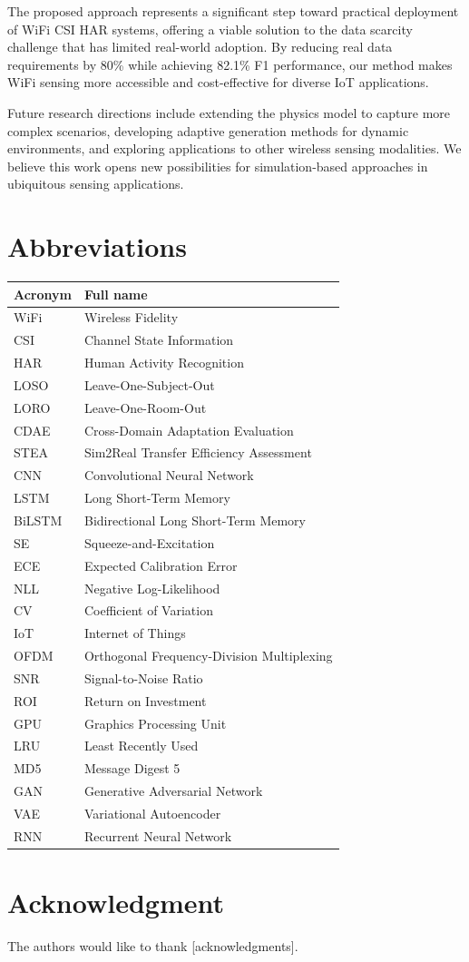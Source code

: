 \documentclass[journal]{IEEEtran}
\begin{document}
The proposed approach represents a significant step toward practical deployment of WiFi CSI HAR systems, offering a viable solution to the data scarcity challenge that has limited real-world adoption. By reducing real data requirements by 80\% while achieving 82.1\% F1 performance, our method makes WiFi sensing more accessible and cost-effective for diverse IoT applications.

Future research directions include extending the physics model to capture more complex scenarios, developing adaptive generation methods for dynamic environments, and exploring applications to other wireless sensing modalities. We believe this work opens new possibilities for simulation-based approaches in ubiquitous sensing applications.

\section*{Abbreviations}
\begin{table}[h]
\centering
\begin{tabular}{@{}ll@{}}
\toprule
\textbf{Acronym} & \textbf{Full name} \\
\midrule
WiFi & Wireless Fidelity \\
CSI & Channel State Information \\
HAR & Human Activity Recognition \\
LOSO & Leave-One-Subject-Out \\
LORO & Leave-One-Room-Out \\
CDAE & Cross-Domain Adaptation Evaluation \\
STEA & Sim2Real Transfer Efficiency Assessment \\
CNN & Convolutional Neural Network \\
LSTM & Long Short-Term Memory \\
BiLSTM & Bidirectional Long Short-Term Memory \\
SE & Squeeze-and-Excitation \\
ECE & Expected Calibration Error \\
NLL & Negative Log-Likelihood \\
CV & Coefficient of Variation \\
IoT & Internet of Things \\
OFDM & Orthogonal Frequency-Division Multiplexing \\
SNR & Signal-to-Noise Ratio \\
ROI & Return on Investment \\
GPU & Graphics Processing Unit \\
LRU & Least Recently Used \\
MD5 & Message Digest 5 \\
GAN & Generative Adversarial Network \\
VAE & Variational Autoencoder \\
RNN & Recurrent Neural Network \\
\bottomrule
\end{tabular}
\end{table}

\section*{Acknowledgment}

The authors would like to thank [acknowledgments].




\end{document}
